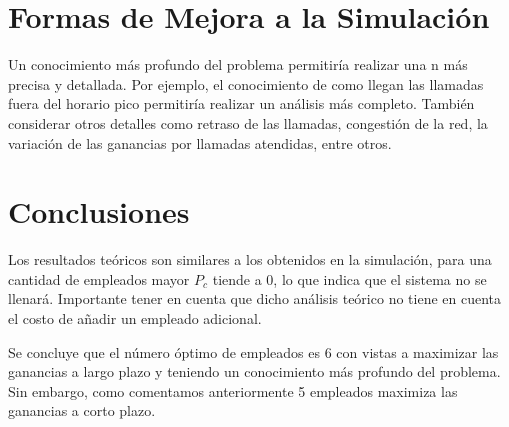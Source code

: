 \documentclass{article}
\begin{document}
\section{Formas de Mejora a la Simulación}
Un conocimiento más profundo del problema permitiría realizar una n más precisa y detallada. Por ejemplo,
el conocimiento de como llegan las llamadas fuera del horario pico permitiría realizar un análisis más completo.
También considerar otros detalles como retraso de las llamadas, congestión de la red, la variación de las ganancias por llamadas atendidas, entre otros.

\section{Conclusiones}
Los resultados teóricos son similares a los obtenidos en la simulación, para una cantidad de empleados mayor $P_c$ tiende a 0, lo que indica que el sistema no se llenará. 
Importante tener en cuenta que dicho análisis teórico no tiene en cuenta el costo de añadir un empleado adicional.

Se concluye que el número óptimo de empleados es 6 con vistas a maximizar las ganancias a largo plazo y teniendo un conocimiento más profundo del problema. 
Sin embargo, como comentamos anteriormente 5 empleados maximiza las ganancias a corto plazo. 
\end{document}
